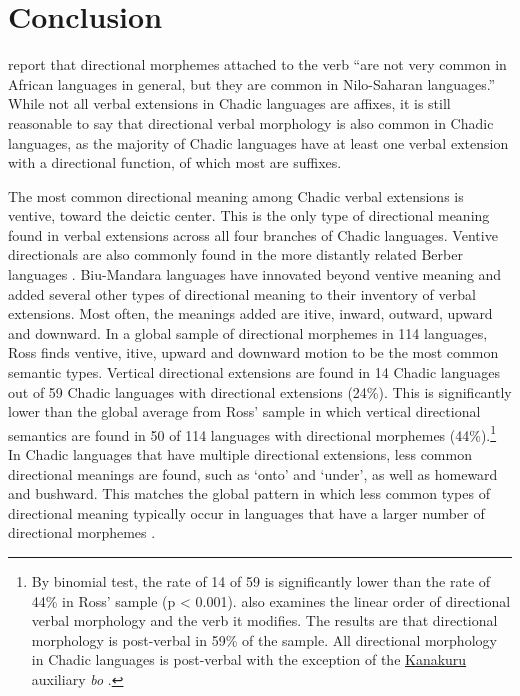 \section{Conclusion} \label{sec:sumdir}

\citet[148]{creisselsAfricaMorphosyntacticArea2008} report that directional morphemes attached to the verb ``are not very common in African languages in general, but they are common in Nilo-Saharan languages.'' While not all verbal extensions in Chadic languages are affixes, it is still reasonable to say that directional verbal morphology is also common in Chadic languages, as the majority of Chadic languages have at least one verbal extension with a directional function, of which most are suffixes. 

The most common directional meaning among Chadic verbal extensions is ventive, toward the deictic center. This is the only type of directional meaning found in verbal extensions across all four branches of Chadic languages. Ventive directionals are also commonly found in the more distantly related Berber languages \citep{mettouchiGrammaticalizationDirectionalClitics2011}. Biu-Mandara languages have innovated beyond ventive meaning and added several other types of directional meaning to their inventory of verbal extensions. Most often, the meanings added are itive, inward, outward, upward and downward. In a global sample of directional morphemes in 114 languages, Ross finds ventive, itive, upward and downward motion to be the most common semantic types. Vertical directional extensions are found in 14 Chadic languages out of 59 Chadic languages with directional extensions (24\%). This is significantly lower than the global average from Ross' sample in which vertical directional semantics are found in 50 of 114 languages with directional morphemes (44\%).\footnote{By binomial test, the rate of 14 of 59 is significantly lower than the rate of 44\% in Ross' sample (p < 0.001). \citet[279]{rossPseudocoordinationSerialVerb2021} also examines the linear order of directional verbal morphology and the verb it modifies. The results are that directional morphology is post-verbal in 59\% of the sample. All directional morphology in Chadic languages is post-verbal with the exception of the \hyperref[kana]{Kanakuru} auxiliary \textit{bo} \citep[76]{newmanKanakuruLanguage1974}.} In Chadic languages that have multiple directional extensions, less common directional meanings are found, such as `onto' and `under', as well as homeward and bushward. This matches the global pattern in which less common types of directional meaning typically occur in languages that have a larger number of directional morphemes \citep[278]{rossPseudocoordinationSerialVerb2021}. 

